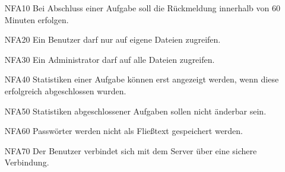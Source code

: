 \documentclass[a4paper,12pt]{article}
\begin{document}
\begin{itemize}[nosep]
\leftskip=0.5cm

	\item[NFA10] \hspace{\parindent} Bei Abschluss einer Aufgabe soll die Rückmeldung innerhalb von 60 Minuten erfolgen.
	
	\item[NFA20] \hspace{\parindent} Ein \gls{Benutzer} darf nur auf eigene Dateien zugreifen.
	
	\item[NFA30]\hspace{\parindent} Ein \gls{Administrator} darf auf alle Dateien zugreifen.
	
	\item[NFA40] \hspace{\parindent} Statistiken einer Aufgabe können erst angezeigt werden, wenn diese erfolgreich abgeschlossen wurden. %
	
	\item[NFA50] \hspace{\parindent} Statistiken abgeschlossener Aufgaben sollen nicht änderbar sein.
	
	\item[NFA60] \hspace{\parindent} Passwörter werden nicht als Fließtext gespeichert werden.
	
	\item[NFA70] \hspace{\parindent} Der \gls{Benutzer} verbindet sich mit dem Server über eine sichere Verbindung.
	

\end{itemize}
\end{document}
